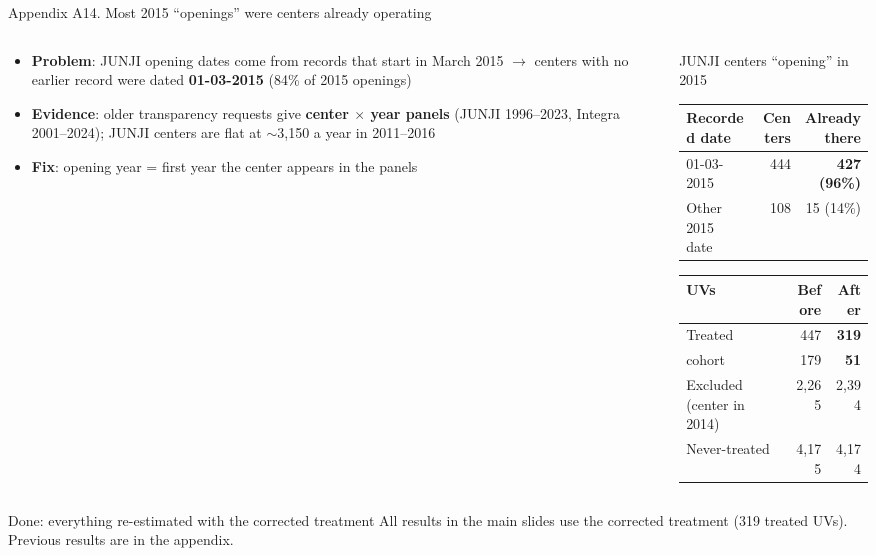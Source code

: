 \documentclass[aspectratio=169,10pt]{beamer}
\newcommand{\takeaway}[1]{\par\vspace{6pt}{\small\textcolor{steel}{$\Rightarrow$}\ \textbf{\textcolor{navy}{#1}}}}
\begin{document}
\begin{frame}{Appendix A14. Most 2015 ``openings'' were centers already operating}
\begin{columns}[T]
\begin{column}{0.52\textwidth}
\footnotesize
\begin{itemize}[itemsep=3pt]
  \item \textbf{Problem}: JUNJI opening dates come from records that start in March 2015 $\to$ centers with no earlier record were dated \textbf{01-03-2015} (84\% of 2015 openings)
  \item \textbf{Evidence}: older transparency requests give \textbf{center $\times$ year panels} (JUNJI 1996--2023, Integra 2001--2024); JUNJI centers are flat at $\sim$3{,}150 a year in 2011--2016
  \item \textbf{Fix}: opening year = first year the center appears in the panels
\end{itemize}
\end{column}
\begin{column}{0.44\textwidth}
\centering
\scriptsize
JUNJI centers ``opening'' in 2015\\[3pt]
\begin{tabular}{@{}lrr@{}}
\toprule
Recorded date & Centers & Already there \\
\midrule
01-03-2015 & 444 & \textbf{427 (96\%)} \\
Other 2015 date & 108 & 15 (14\%) \\
\bottomrule
\end{tabular}

\vspace{10pt}
\begin{tabular}{@{}lrr@{}}
\toprule
UVs & Before & After \\
\midrule
Treated & 447 & \textbf{319} \\
\quad 2015 cohort & 179 & \textbf{51} \\
Excluded (center in 2014) & 2{,}265 & 2{,}394 \\
Never-treated & 4{,}175 & 4{,}174 \\
\bottomrule
\end{tabular}
\end{column}
\end{columns}

\vspace{4pt}
\begin{block}{Done: everything re-estimated with the corrected treatment}
\scriptsize
All results in the main slides use the corrected treatment (319 treated UVs). Previous results are in the appendix.
\end{block}
\takeaway{The 2015 cohort was mostly a data artifact: 127 of its 179 UVs already had a center in 2014.}
\end{frame}
\end{document}
